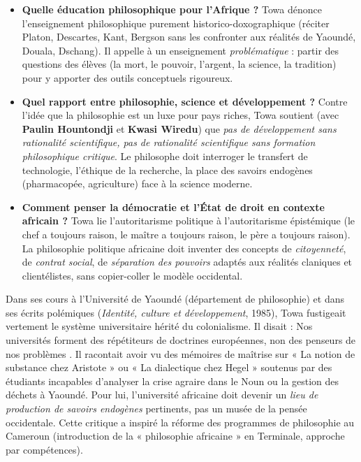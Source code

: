 \documentclass[11pt]{article}
\begin{document}
\begin{itemize}
    \item \textbf{Quelle éducation philosophique pour l'Afrique ?} Towa dénonce l'enseignement philosophique purement historico-doxographique (réciter Platon, Descartes, Kant, Bergson sans les confronter aux réalités de Yaoundé, Douala, Dschang). Il appelle à un enseignement \emph{problématique} : partir des questions des élèves (la mort, le pouvoir, l'argent, la science, la tradition) pour y apporter des outils conceptuels rigoureux.
    \item \textbf{Quel rapport entre philosophie, science et développement ?} Contre l'idée que la philosophie est un luxe pour pays riches, Towa soutient (avec \textbf{Paulin Hountondji} et \textbf{Kwasi Wiredu}) que \emph{pas de développement sans rationalité scientifique, pas de rationalité scientifique sans formation philosophique critique}. Le philosophe doit interroger le transfert de technologie, l'éthique de la recherche, la place des savoirs endogènes (pharmacopée, agriculture) face à la science moderne.
    \item \textbf{Comment penser la démocratie et l'État de droit en contexte africain ?} Towa lie l'autoritarisme politique à l'autoritarisme épistémique (le chef a toujours raison, le maître a toujours raison, le père a toujours raison). La philosophie politique africaine doit inventer des concepts de \emph{citoyenneté}, de \emph{contrat social}, de \emph{séparation des pouvoirs} adaptés aux réalités claniques et clientélistes, sans copier-coller le modèle occidental.
\end{itemize}

\begin{savaistu}
Dans ses cours à l'Université de Yaoundé (département de philosophie) et dans ses écrits polémiques (\emph{Identité, culture et développement}, 1985), Towa fustigeait vertement le système universitaire hérité du colonialisme. Il disait : \guillemotleft Nos universités forment des répétiteurs de doctrines européennes, non des penseurs de nos problèmes \guillemotright. Il racontait avoir vu des mémoires de maîtrise sur « La notion de substance chez Aristote » ou « La dialectique chez Hegel » soutenus par des étudiants incapables d'analyser la crise agraire dans le Noun ou la gestion des déchets à Yaoundé. Pour lui, l'université africaine doit devenir un \emph{lieu de production de savoirs endogènes} pertinents, pas un musée de la pensée occidentale. Cette critique a inspiré la réforme des programmes de philosophie au Cameroun (introduction de la « philosophie africaine » en Terminale, approche par compétences).
\end{savaistu}
\end{document}
